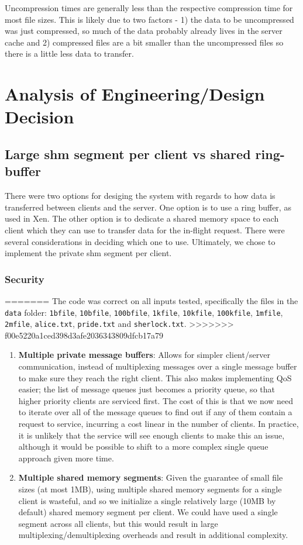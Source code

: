 \documentclass[paper=a4,fontsize=11pt]{report} %
\numberwithin{equation}{section} %
\numberwithin{figure}{section} %
\numberwithin{table}{section} %
\begin{document}
Uncompression times are generally less than the respective compression time for most file sizes. This is likely due to two factors - 1) the data to be uncompressed was just compressed, so much of the data probably already lives in the server cache and 2) compressed files are a bit smaller than the uncompressed files so there is a little less data to transfer.

\section{Analysis of Engineering/Design Decision}

\subsection{Large shm segment per client vs shared ring-buffer}
There were two options for desiging the system with regards to how data is transferred between clients and the server. One option is to use a ring buffer, as used in Xen. The other option is to dedicate a shared memory space to each client which they can use to transfer data for the in-flight request. There were several considerations in deciding which one to use. Ultimately, we chose to implement the private shm segment per client.

\subsubsection{Security}
=======
The code was correct on all inputs tested, specifically the files in the \texttt{data} folder: \texttt{1bfile}, \texttt{10bfile}, \texttt{100bfile}, \texttt{1kfile}, \texttt{10kfile}, \texttt{100kfile}, \texttt{1mfile}, \texttt{2mfile}, \texttt{alice.txt}, \texttt{pride.txt} and \texttt{sherlock.txt}.
>>>>>>> f00e5220a1ced398d3afe2036343809dfcb17a79


\begin{enumerate}
\item \textbf{Multiple private message buffers}: Allows for simpler client/server communication, instead of multiplexing messages over a single message buffer to make sure they reach the right client. This also makes implementing QoS easier; the list of message queues just becomes a priority queue, so that higher priority clients are serviced first. The cost of this is that we now need to iterate over all of the message queues to find out if any of them contain a request to service, incurring a cost linear in the number of clients. In practice, it is unlikely that the service will see enough clients to make this an issue, although it would be possible to shift to a more complex single queue approach given more time. 
\item \textbf{Multiple shared memory segments}: Given the guarantee of small file sizes (at most 1MB), using multiple shared memory segments for a single client is wasteful, and so we initialize a single relatively large (10MB by default) shared memory segment per client. We could have used a single segment across all clients, but this would result in large multiplexing/demultiplexing overheads and result in additional complexity.
\end{enumerate}
\end{document}
